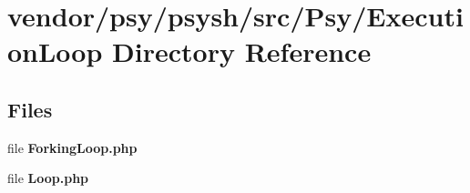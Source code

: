 \section{vendor/psy/psysh/src/\+Psy/\+Execution\+Loop Directory Reference}
\label{dir_48cf05d4c31689d94e4c6f672163e15d}
\subsection*{Files}
\begin{DoxyCompactItemize}
\item 
file {\bf Forking\+Loop.\+php}
\item 
file {\bf Loop.\+php}
\end{DoxyCompactItemize}
